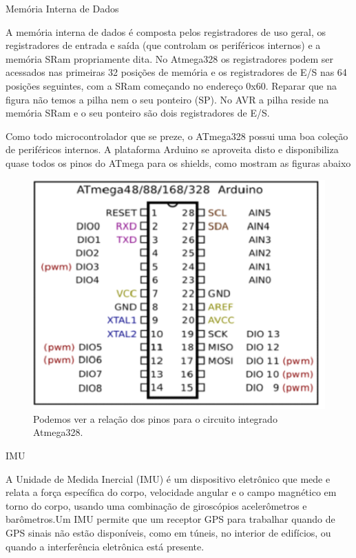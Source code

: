 Memória Interna de Dados

A memória interna de dados é composta pelos registradores de uso geral, os registradores de entrada e saída (que controlam os periféricos internos) e a memória SRam propriamente dita.
No Atmega328 os registradores podem ser acessados nas primeiras 32 posições de memória e os registradores de E/S nas 64 posições seguintes, com a SRam começando no endereço 0x60.
Reparar que na figura não temos a pilha nem o seu ponteiro (SP). No AVR a pilha reside na memória SRam e o seu ponteiro são dois registradores de E/S.


Como todo microcontrolador que se preze, o ATmega328 possui uma boa coleção de periféricos internos. A plataforma Arduino se aproveita disto e disponibiliza quase todos os pinos do ATmega para os shields, como mostram as figuras abaixo


\FloatBarrier
 \begin{figure} [!htp]
	\centering
	\includegraphics[scale=0.6]{figuras/pinagematmega}
	\caption{Podemos ver a relação dos pinos para o circuito integrado Atmega328.}
	\label{pinagematmega}
\end{figure}
\FloatBarrier

IMU

A Unidade de Medida Inercial (IMU) é um dispositivo eletrônico que mede e relata a força específica do corpo, velocidade angular e o campo magnético em torno do corpo, usando uma combinação de giroscópios acelerômetros e barômetros.Um IMU permite que um receptor GPS para trabalhar quando de GPS sinais não estão disponíveis, como em túneis, no interior de edifícios, ou quando a interferência eletrônica está presente.

